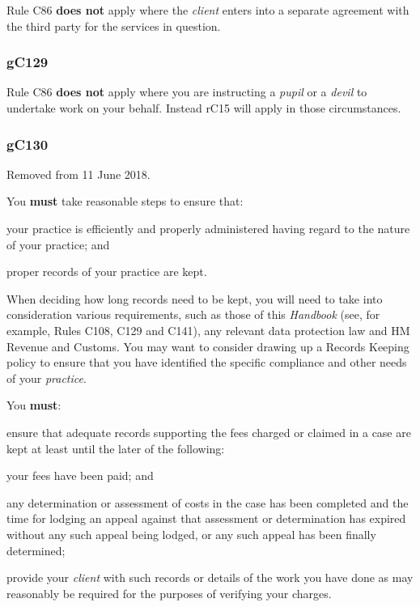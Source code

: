Rule C86 \textcolor{myred}{\textbf{does not}} apply where the \emph{client} enters into a separate
agreement with the third party for the services in question.

\subsubsection{\color{darkgrey}gC129}

Rule C86 \textcolor{myred}{\textbf{does not}} apply where you are instructing a \emph{pupil} or a
\emph{devil} to undertake work on your behalf. Instead rC15 will apply
in those circumstances.

\subsubsection{\color{darkgrey}gC130}

Removed from 11 June 2018.




You \textcolor{myred}{\textbf{must}} take reasonable steps to ensure that:
\begin{numlist}\item your practice is efficiently and properly administered having regard
to the nature of your practice; and
\item proper records of your practice are kept.

When deciding how long records need to be kept, you will need to take
into consideration various requirements, such as those of this
\emph{Handbook} (see, for example, Rules C108, C129 and C141), any
relevant data protection law and HM Revenue and Customs. You may want to
consider drawing up a Records Keeping policy to ensure that you have
identified the specific compliance and other needs of your
\emph{practice}.
\end{numlist}


You \textcolor{myred}{\textbf{must}}:

\begin{numlist}\item ensure that adequate records supporting the fees charged or claimed
in a case are kept at least until the later of the following:
\begin{alphlist}
\item your fees have been paid; and

\item any determination or assessment of costs in the case has been
completed and the time for lodging an appeal against that assessment or
determination has expired without any such appeal being lodged, or any
such appeal has been finally determined;

\item provide your \emph{client} with such records or details of the work
you have done as may reasonably be required for the purposes of
verifying your charges.\end{alphlist}\end{numlist}

